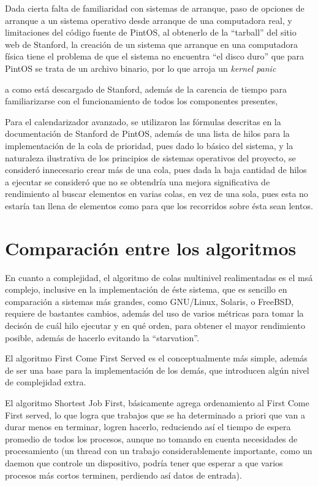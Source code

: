 \documentclass[letterpaper,journal,12pt]{IEEEtran}
\begin{document}
Dada cierta falta de familiaridad con sistemas de arranque, paso de opciones de arranque a un sistema operativo desde arranque de una computadora real, y limitaciones del código fuente de PintOS, al obtenerlo de la ``tarball'' del sitio web de Stanford, la creación de un sistema que arranque en una computadora física tiene el problema de que el sistema no encuentra ``el disco duro'' que para PintOS se trata de un archivo binario, por lo que arroja un \textit{kernel panic}

a como está descargado de Stanford, además de la carencia de tiempo para familiarizarse con el funcionamiento de todos los componentes presentes, 

Para el calendarizador avanzado, se utilizaron las fórmulas descritas en la documentación de Stanford de PintOS, además de una lista
de hilos para la implementación de la cola de prioridad, pues dado lo básico del sistema, y la naturaleza ilustrativa de los principios
de sistemas operativos del proyecto, se consideró innecesario crear más de una cola, pues dada la baja cantidad de hilos a ejecutar
se consideró que no se obtendría una mejora significativa de rendimiento al buscar elementos en varias colas, en vez de una sola, pues esta
no estaría tan llena de elementos como para que los recorridos sobre ésta sean lentos.

\section{Comparación entre los algoritmos}

En cuanto a complejidad, el algoritmo de colas multinivel realimentadas es el msá complejo, inclusive en la implementación de éste sistema, que es sencillo en comparación
a sistemas más grandes, como GNU/Linux, Solaris, o FreeBSD, requiere de bastantes cambios,
además del uso de varios métricas para tomar la decisón de cuál hilo ejecutar y en
qué orden, para obtener el mayor rendimiento posible, además de hacerlo evitando la ``starvation''.

El algoritmo First Come First Served es el conceptualmente más simple, además de ser
una base para la implementación de los demás, que introducen algún nivel de complejidad
extra.

El algoritmo Shortest Job First, básicamente agrega ordenamiento al First Come First served, lo que logra que trabajos que se ha determinado a priori que van a durar menos
en terminar, logren hacerlo, reduciendo así el tiempo de espera promedio de todos los procesos, aunque no tomando en cuenta necesidades de procesamiento (un thread con un trabajo considerablemente importante, como un daemon que controle un dispositivo, podría
tener que esperar a que varios procesos más cortos terminen, perdiendo así datos de entrada).
\end{document}
